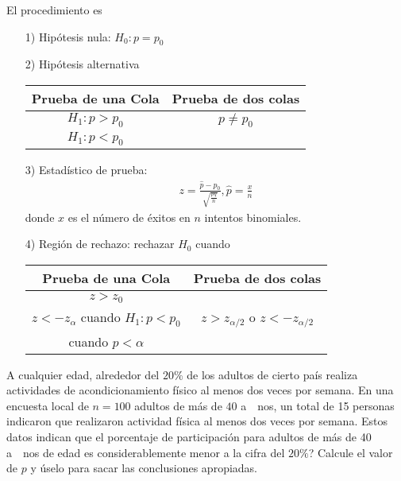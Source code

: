 \begin{frame}
\begin{frame}
El procedimiento es
\begin{itemize}
\item[1) ] Hip\'otesis nula: $H_{0}:p=p_{0}$
\item[2) ] Hip\'otesis alternativa
\begin{tabular}{cc}\hline
\textbf{Prueba de una Cola} & \textbf{Prueba de dos colas}\\\hline
$H_{1}:p>p_{0}$ & $p\neq p_{0}$\\
$H_{1}:p<p_{0}$ & \\
\end{tabular}
\item[3) ] Estad\'istico de prueba:
\begin{eqnarray*}
z=\frac{\hat{p}-p_{0}}{\sqrt{\frac{pq}{n}}},\hat{p}=\frac{x}{n}
\end{eqnarray*}
donde $x$ es el n\'umero de \'exitos en $n$ intentos binomiales.

\end{itemize}







\begin{itemize}
\item[4) ] Regi\'on de rechazo: rechazar $H_{0}$ cuando
\begin{tabular}{cc}\hline
\textbf{Prueba de una Cola} & \textbf{Prueba de dos colas}\\\hline
$z>z_{0}$ & \\
$z<-z_{\alpha}$ cuando $H_{1}:p<p_{0}$&$z>z_{\alpha/2}$ o $z<-z_{\alpha/2}$\\
 cuando $p<\alpha$&\\
\end{tabular}
\end{itemize}







\begin{Ejem}
A cualquier edad, alrededor del $20\%$ de los adultos de cierto pa\'is realiza actividades de acondicionamiento f\'isico al menos dos veces por semana. En una encuesta local de $n=100$ adultos de m\'as de $40$ a\ ~nos, un total de 15 personas indicaron que realizaron actividad f\'isica al menos dos veces por semana. Estos datos indican que el porcentaje de participaci\'on para adultos de m\'as de 40 a\ ~nos de edad es  considerablemente menor a la cifra del $20\%$? Calcule el valor de $p$ y \'uselo para sacar las conclusiones apropiadas.
\end{Ejem}


\end{frame}
\end{frame}
